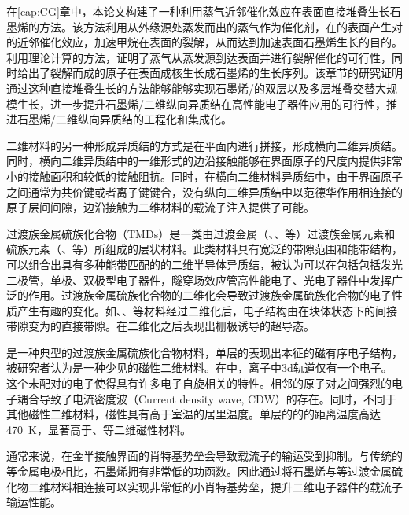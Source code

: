 在\ref{cap:CG}章中，本论文构建了一种利用蒸气近邻催化效应在表面直接堆叠生长石墨烯的方法。该方法利用从外缘源处蒸发而出的蒸气作为催化剂，在的表面产生对的近邻催化效应，加速甲烷在表面的裂解，从而达到加速表面石墨烯生长的目的。利用理论计算的方法，证明了蒸气从蒸发源到达表面并进行裂解催化的可行性，同时给出了裂解而成的原子在表面成核生长成石墨烯的生长序列。该章节的研究证明通过这种直接堆叠生长的方法能够能够实现石墨烯/的双层以及多层堆叠交替大规模生长，进一步提升石墨烯/二维纵向异质结在高性能电子器件应用的可行性，推进石墨烯/二维纵向异质结的工程化和集成化。

二维材料的另一种形成异质结的方式是在平面内进行拼接，形成横向二维异质结。同时，横向二维异质结中的一维形式的边沿接触能够在界面原子的尺度内提供非常小的接触面积和较低的接触阻抗。同时，在横向二维材料异质结中，由于界面原子之间通常为共价键或者离子键键合，没有纵向二维异质结中以范德华作用相连接的原子层间间隙，边沿接触为二维材料的载流子注入提供了可能。

过渡族金属硫族化合物（TMDs）是一类由过渡金属（、、等）过渡族金属元素和硫族元素（、等）所组成的层状材料。此类材料具有宽泛的带隙范围和能带结构，可以组合出具有多种能带匹配的的二维半导体异质结，被认为可以在包括包括发光二极管，单极、双极型电子器件，隧穿场效应管高性能电子、光电子器件中发挥广泛的作用。过渡族金属硫族化合物的二维化会导致过渡族金属硫族化合物的电子性质产生有趣的变化。如、、等材料经过二维化后，电子结构由在块体状态下的间接带隙变为的直接带隙。在二维化之后表现出栅极诱导的超导态。

是一种典型的过渡族金属硫族化合物材料，单层的表现出本征的磁有序电子结构，被研究者认为是一种少见的磁性二维材料。在中，离子中3d轨道仅有一个电子。这个未配对的电子使得具有许多电子自旋相关的特性。相邻的原子对之间强烈的电子耦合导致了电流密度波（Current density wave, CDW）的存在。同时，不同于其他磁性二维材料，磁性具有高于室温的居里温度。单层的的的距离温度高达\SI{470}{\kelvin}，显著高于、等二维磁性材料。

通常来说，在金半接触界面的肖特基势垒会导致载流子的输运受到抑制。与传统的等金属电极相比，石墨烯拥有非常低的功函数。因此通过将石墨烯与等过渡金属硫化物二维材料相连接可以实现非常低的小肖特基势垒，提升二维电子器件的载流子输运性能。

